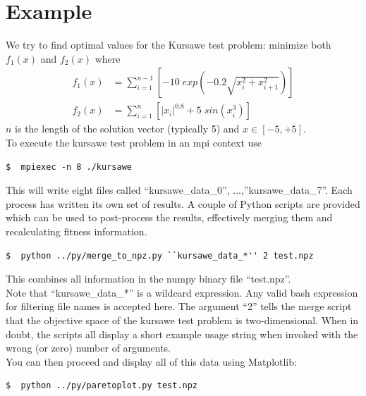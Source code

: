 \documentclass[12pt]{article}
\begin{document}
\section{Example}
We try to find optimal values for the Kursawe\cite{Kur91} test problem: minimize both \begin{math}
f_{1}(x)\end{math} and \begin{math}f_{2}(x)\end{math} where
\begin{align}
f_{1}(x) &= \sum_{i=1}^{n-1} \left[ -10 \; exp  \left( -0.2 \sqrt{ x_{i}^{2} + x_{i+1}^{2} }  \right) \right] \\
f_{2}(x) &= \sum_{i=1}^{n} \left[ |x_{i}|^{0.8} + 5 \; sin\left(x_{i}^{3} \right) \right] 
\end{align}
\begin{math}n\end{math} is the length of the solution vector (typically 5) and \begin{math}x \in \left[-5,+5\right]\end{math}. \\
To execute the kursawe test problem in an mpi context use
\begin{lstlisting}[style=Bash]
$  mpiexec -n 8 ./kursawe
\end{lstlisting}
This will write eight files called ``kursawe\_data\_0'', ...,''kursawe\_data\_7''. Each process has written its own set of results. A couple of Python scripts are provided which can be used to post-process the results, effectively merging them and recalculating fitness information. 
\begin{lstlisting}[style=Bash]
$  python ../py/merge_to_npz.py ``kursawe_data_*'' 2 test.npz
\end{lstlisting}
This combines all information in the numpy binary file ``test.npz''. \\
Note that ``kursawe\_data\_*'' is a wildcard expression. Any valid bash expression for filtering file names is accepted here. The argument ``2'' tells the merge script that the objective space of the kursawe test problem is two-dimensional. When in doubt, the scripts all display a short example usage string when invoked with the wrong (or zero) number of arguments. \\
You can then proceed and display all of this data using Matplotlib: 
\begin{lstlisting}[style=Bash]
$  python ../py/paretoplot.py test.npz
\end{lstlisting}
\end{document}
